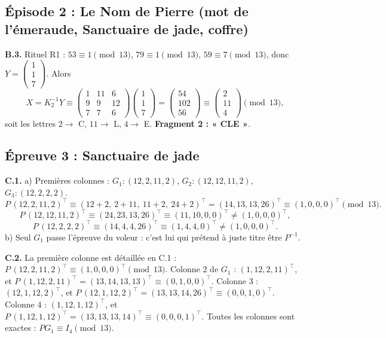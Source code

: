\documentclass[11pt,a4paper]{article}
\begin{document}
\subsection*{Épisode 2 : Le Nom de Pierre (mot de l'émeraude, Sanctuaire de jade, coffre)}

\textbf{B.3.} Rituel R1 : $53 \equiv 1 \pmod{13}$,
$79 \equiv 1 \pmod{13}$, $59 \equiv 7 \pmod{13}$, donc
$Y = \begin{pmatrix}1\\1\\7\end{pmatrix}$.
Alors
\[
X = K_2^{-1}Y \equiv \begin{pmatrix}1&11&6\\9&9&12\\7&7&6\end{pmatrix}
\begin{pmatrix}1\\1\\7\end{pmatrix}
= \begin{pmatrix}54\\102\\56\end{pmatrix}
\equiv \begin{pmatrix}2\\11\\4\end{pmatrix} \pmod{13},
\]
soit les lettres $2 \to$ C, $11 \to$ L, $4 \to$ E.
\textbf{Fragment 2 : « CLE »}.

\subsection*{Épreuve 3 : Sanctuaire de jade}
\textbf{C.1.} a) Premières colonnes :
$G_1 : (12,2,11,2)$, $G_2 : (12,12,11,2)$, $G_3 : (12,2,2,2)$.
\[
P\,(12,2,11,2)^{\!\top} \equiv (12+2,\ 2+11,\ 11+2,\ 24+2)^{\!\top}
= (14,13,13,26)^{\!\top} \equiv (1,0,0,0)^{\!\top} \pmod{13}.
\]
\[
P\,(12,12,11,2)^{\!\top} \equiv (24,23,13,26)^{\!\top}
\equiv (11,10,0,0)^{\!\top} \neq (1,0,0,0)^{\!\top},
\]
\[
P\,(12,2,2,2)^{\!\top} \equiv (14,4,4,26)^{\!\top}
\equiv (1,4,4,0)^{\!\top} \neq (1,0,0,0)^{\!\top}.
\]
b) Seul $G_1$ passe l'épreuve du voleur : c'est lui qui prétend à juste
titre être $P^{-1}$.

\textbf{C.2.} La première colonne est détaillée en C.1 :
$P\,(12,2,11,2)^{\!\top} \equiv (1,0,0,0)^{\!\top} \pmod{13}$.
Colonne 2 de $G_1$ : $(1,12,2,11)^{\!\top}$, et
$P\,(1,12,2,11)^{\!\top} = (13,14,13,13)^{\!\top}
\equiv (0,1,0,0)^{\!\top}$. Colonne 3 : $(12,1,12,2)^{\!\top}$, et
$P\,(12,1,12,2)^{\!\top} = (13,13,14,26)^{\!\top}
\equiv (0,0,1,0)^{\!\top}$. Colonne 4 : $(1,12,1,12)^{\!\top}$, et
$P\,(1,12,1,12)^{\!\top} = (13,13,13,14)^{\!\top}
\equiv (0,0,0,1)^{\!\top}$. Toutes les colonnes sont exactes :
$P G_1 \equiv I_4 \pmod{13}$.
\end{document}

